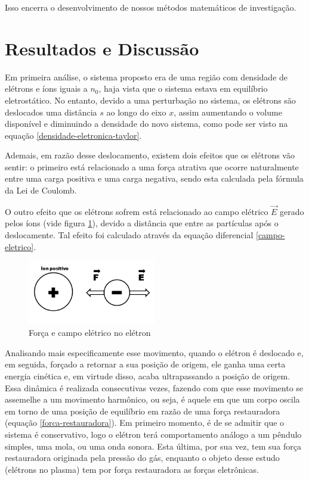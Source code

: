 \documentclass[
	article,
	11pt,
	oneside,
	a4paper,
	english,
	brazil,
	sumario=tradicional
	]{abntex2}
\begin{document}
Isso encerra o desenvolvimento de nossos métodos matemáticos de investigação.

\section{Resultados e Discussão}

 Em primeira análise, o sistema proposto era de uma região com densidade de elétrons e íons iguais a $n_0$, haja vista que o sistema estava em equilíbrio eletrostático. No entanto, devido a uma perturbação no sistema, os elétrons são deslocados uma distância $s$ ao longo do eixo $x$, assim aumentando o volume disponível e diminuindo a densidade do novo sistema, como pode ser visto na  equação \ref{densidade-eletronica-taylor}.

Ademais, em razão desse deslocamento, existem dois efeitos que os elétrons vão sentir: o primeiro está relacionado a uma força atrativa que ocorre naturalmente entre uma carga positiva e uma carga negativa, sendo esta calculada pela fórmula da Lei de Coulomb.

O outro efeito que os elétrons sofrem está relacionado ao campo elétrico $\vec{E}$ gerado pelos íons (vide figura \ref{forcas}), devido a distância que entre as partículas após o deslocamente. Tal efeito foi calculado através da equação diferencial \ref{campo-eletrico}.

\begin{figure}[htb]
    \caption{\label{forcas}Força e campo elétrico no elétron}
    \centering
    \includegraphics[width=0.5\textwidth]{forcas.jpeg}
\end{figure}

Analisando mais especificamente esse movimento, quando o elétron é deslocado e, em seguida, forçado a retornar a sua posição de origem, ele ganha uma certa energia cinética e, em virtude disso, acaba ultrapassando a posição de origem. Essa dinâmica é realizada consecutivas vezes, fazendo com que esse movimento se assemelhe a um movimento harmônico, ou seja, é aquele em que um corpo oscila em torno de uma posição de equilíbrio em razão de uma força restauradora (equação \ref{forca-restauradora}). Em primeiro momento, é de se admitir que o sistema é conservativo, logo o elétron terá comportamento análogo a um pêndulo simples, uma mola, ou uma onda sonora. Esta última, por sua vez, tem sua força restauradora originada pela pressão do gás, enquanto o objeto desse estudo (elétrons no plasma) tem por força restauradora as forças eletrônicas.
\end{document}
